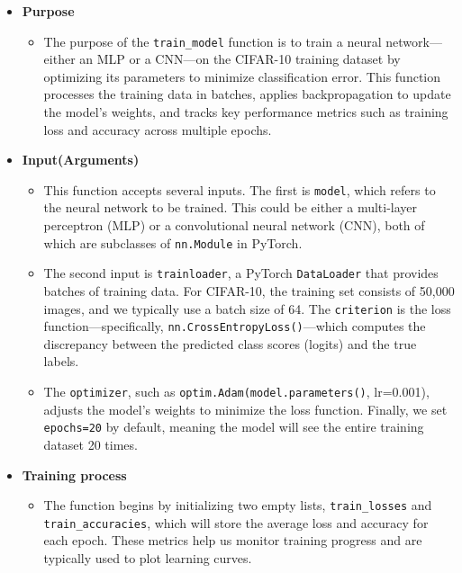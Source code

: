 \documentclass[a4paper,12pt]{article}
\begin{document}
\begin{itemize}
    \item \textbf{Purpose}
    \begin{itemize}
        \item The purpose of the \verb|train_model| function is to train a neural network—either an MLP or a CNN—on the CIFAR-10 training dataset by optimizing its parameters to minimize classification error. This function processes the training data in batches, applies backpropagation to update the model's weights, and tracks key performance metrics such as training loss and accuracy across multiple epochs.
    \end{itemize}

    \item \textbf{Input(Arguments)}
    \begin{itemize}
        \item This function accepts several inputs. The first is \verb|model|, which refers to the neural network to be trained. This could be either a multi-layer perceptron (MLP) or a convolutional neural network (CNN), both of which are subclasses of \verb|nn.Module| in PyTorch. 
        
        \item  The second input is \verb|trainloader|, a PyTorch \verb|DataLoader| that provides batches of training data. For CIFAR-10, the training set consists of 50,000 images, and we typically use a batch size of 64. The \verb|criterion| is the loss function—specifically, \verb|nn.CrossEntropyLoss()|—which computes the discrepancy between the predicted class scores (logits) and the true labels. 
        
        \item The \verb|optimizer|, such as \verb|optim.Adam(model.parameters()|, lr=0.001), adjusts the model’s weights to minimize the loss function. Finally, we set \verb|epochs=20| by default, meaning the model will see the entire training dataset 20 times.
    \end{itemize}

    \item \textbf{Training process}
    \begin{itemize}
        \item The function begins by initializing two empty lists, \verb|train_losses| and \\ \verb|train_accuracies|, which will store the average loss and accuracy for each epoch. These metrics help us monitor training progress and are typically used to plot learning curves.


\end{itemize}
\end{itemize}
\end{document}

